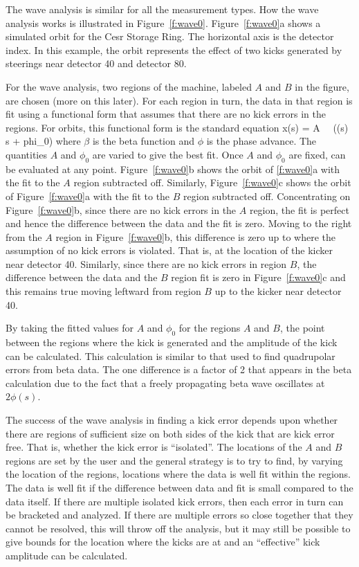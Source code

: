 The wave analysis is similar for all the measurement types. How the
wave analysis works is illustrated in Figure~\ref{f:wave0}.
Figure~\ref{f:wave0}a shows a simulated orbit for the Cesr Storage
Ring. The horizontal axis is the detector index. In this example, the
orbit represents the effect of two kicks generated by steerings near
detector 40 and detector 80.

For the wave analysis, two regions of the machine, labeled $A$ and $B$
in the figure, are chosen (more on this later). For each region in
turn, the data in that region is fit using a functional form that
assumes that there are no kick errors in the regions. For orbits, this
functional form is the standard equation
\Begineq
  x(s) = A \,  \, \sin(\phi(s) \, s + phi_0)
  \label{xabps}
\Endeq
where $\beta$ is the beta function and $\phi$ is the phase
advance. The quantities $A$ and $\phi_0$ are varied to give the best
fit.  Once $A$ and $\phi_0$ are fixed,  can be evaluated at
any point. Figure~\ref{f:wave0}b shows the orbit of \ref{f:wave0}a
with the fit to the $A$ region subtracted off. Similarly,
Figure~\ref{f:wave0}c shows the orbit of Figure~\ref{f:wave0}a with
the fit to the $B$ region subtracted off. Concentrating on
Figure~\ref{f:wave0}b, since there are no kick errors in the $A$
region, the fit is perfect and hence the difference between the data
and the fit is zero. Moving to the right from the $A$ region in
Figure~\ref{f:wave0}b, this difference is zero up to where the
assumption of no kick errors is violated. That is, at the location of
the kicker near detector 40. Similarly, since there are no kick errors
in region $B$, the difference between the data and the $B$ region fit
is zero in Figure~\ref{f:wave0}c and this remains true moving leftward
from region $B$ up to the kicker near detector 40.

By taking the fitted values for $A$ and $\phi_0$ for the regions $A$
and $B$, the point between the regions where the kick is generated and
the amplitude of the kick can be calculated. This calculation is
similar to that used to find quadrupolar errors from beta
data\cite{f:wave0}. The one difference is a factor of 2 that appears
in the beta calculation due to the fact that a freely propagating beta
wave oscillates at $2\phi(s)$. 

The success of the wave analysis in finding a kick error depends upon
whether there are regions of sufficient size on both sides of the kick
that are kick error free. That is, whether the kick error is
``isolated''. The locations of the $A$ and $B$ regions are set by the
user and the general strategy is to try to find, by varying the
location of the regions, locations where the data is well fit within
the regions. The data is well fit if the difference between data and
fit is small compared to the data itself. If there are multiple
isolated kick errors, then each error in turn can be bracketed and
analyzed. If there are multiple errors so close together that they
cannot be resolved, this will throw off the analysis, but it may still
be possible to give bounds for the location where the kicks are at and
an ``effective'' kick amplitude can be calculated.

